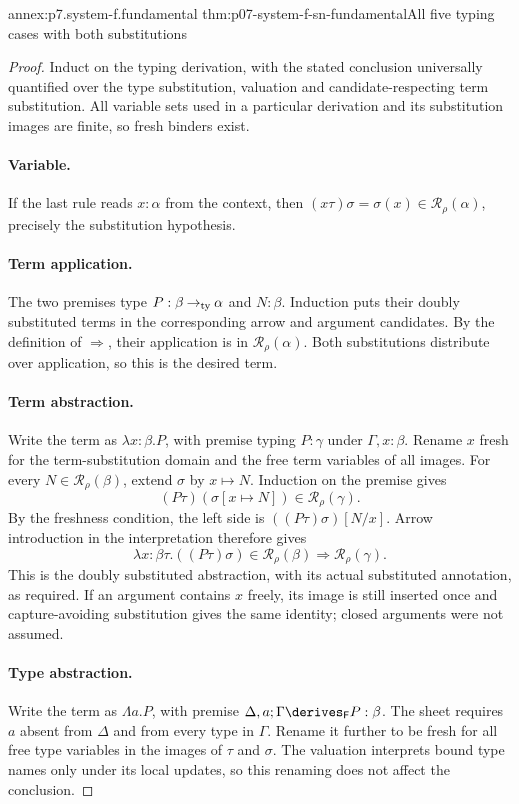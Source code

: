 \begin{annexitem}{annex:p7.system-f.fundamental}
 {thm:p07-system-f-sn-fundamental}{All five typing cases with both substitutions}
\begin{proof}
Induct on the typing derivation, with the stated conclusion universally
quantified over the type substitution, valuation and candidate-respecting
term substitution. All variable sets used in a particular derivation and
its substitution images are finite, so fresh binders exist.

\paragraph{Variable.}
If the last rule reads \(x:\alpha\) from the context, then
\((x\tau)\sigma=\sigma(x)\in\mathcal R_\rho(\alpha)\), precisely
the substitution hypothesis.

\paragraph{Term application.}
The two premises type \(P:\beta\mathbin{\to_{\rm ty}}\alpha\)
and \(N:\beta\). Induction puts their doubly substituted terms in
the corresponding arrow and argument candidates. By the definition of
\(\Rightarrow\), their application is in \(\mathcal R_\rho(\alpha)\).
Both substitutions distribute over application, so this is the desired
term.

\paragraph{Term abstraction.}
Write the term as \(\lambda x{:}\beta.P\), with premise typing
\(P:\gamma\) under \(\Gamma,x:\beta\). Rename \(x\) fresh for
the term-substitution domain and the free term variables of all images.
For every \(N\in\mathcal R_\rho(\beta)\), extend \(\sigma\) by
\(x\mapsto N\). Induction on the premise gives
\[
 (P\tau)(\sigma[x\mapsto N])\in\mathcal R_\rho(\gamma).
\]
By the freshness condition, the left side is
\(((P\tau)\sigma)[N/x]\). Arrow introduction in the interpretation
therefore gives
\[
 \lambda x{:}\beta\tau.((P\tau)\sigma)
 \in\mathcal R_\rho(\beta)\Rightarrow\mathcal R_\rho(\gamma).
\]
This is the doubly substituted abstraction, with its actual substituted
annotation, as required. If an argument contains \(x\) freely, its
image is still inserted once and capture-avoiding substitution gives the
same identity; closed arguments were not assumed.

\paragraph{Type abstraction.}
Write the term as \(\Lambda a.P\), with premise
\(\Delta,a;\Gamma\derives_{\mathsf F}P:\beta\).
The sheet requires \(a\) absent from \(\Delta\) and from every
type in \(\Gamma\). Rename it further to be fresh for all free type
variables in the images of \(\tau\) and \(\sigma\). The valuation
interprets bound type names only under its local updates, so this renaming
does not affect the conclusion.


\end{proof}
\end{annexitem}
